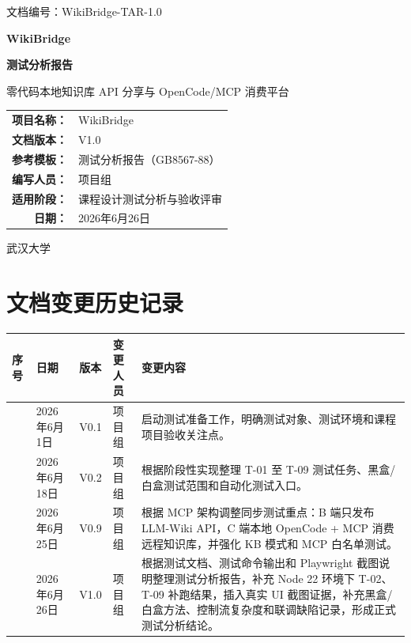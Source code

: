 \documentclass[UTF8,a4paper,12pt,fontset=fandol]{ctexart}
\newcommand{\docid}{WikiBridge-TAR-1.0}
\newcommand{\docdate}{2026年6月26日}
\begin{document}
\begin{titlepage}
  \thispagestyle{empty}
  \begin{flushleft}
    \small 文档编号：\docid
  \end{flushleft}
  \vspace*{2.2cm}
  \begin{center}
    {\bfseries WikiBridge\par}
    \vspace{0.5cm}
    {\bfseries 测试分析报告\par}
    \vspace{0.8cm}
    {\large 零代码本地知识库 API 分享与 OpenCode/MCP 消费平台\par}
    \vspace{2.4cm}
    \begin{tabular}{>{\bfseries}r l}
      项目名称： & WikiBridge \\
      文档版本： & V1.0 \\
      参考模板： & 测试分析报告（GB8567-88） \\
      编写人员： & 项目组 \\
      适用阶段： & 课程设计测试分析与验收评审 \\
      日期： & \docdate \\
    \end{tabular}
  \end{center}
  \vfill
  \begin{center}
    武汉大学
  \end{center}
\end{titlepage}

\section*{文档变更历史记录}
\begin{longtable}{>{\centering\arraybackslash}p{1.2cm}>{\centering\arraybackslash}p{2.8cm}>{\centering\arraybackslash}p{1.8cm}>{\centering\arraybackslash}p{2.2cm}p{6.2cm}}
\toprule
序号 & 日期 & 版本 & 变更人员 & 变更内容 \\
\midrule
1 & 2026年6月1日 & V0.1 & 项目组 & 启动测试准备工作，明确测试对象、测试环境和课程项目验收关注点。 \\
2 & 2026年6月18日 & V0.2 & 项目组 & 根据阶段性实现整理 T-01 至 T-09 测试任务、黑盒/白盒测试范围和自动化测试入口。 \\
3 & 2026年6月25日 & V0.9 & 项目组 & 根据 MCP 架构调整同步测试重点：B 端只发布 LLM-Wiki API，C 端本地 OpenCode + MCP 消费远程知识库，并强化 KB 模式和 MCP 白名单测试。 \\
4 & 2026年6月26日 & V1.0 & 项目组 & 根据测试文档、测试命令输出和 Playwright 截图说明整理测试分析报告，补充 Node 22 环境下 T-02、T-09 补跑结果，插入真实 UI 截图证据，补充黑盒/白盒方法、控制流复杂度和联调缺陷记录，形成正式测试分析结论。 \\
\bottomrule
\end{longtable}
\end{document}
